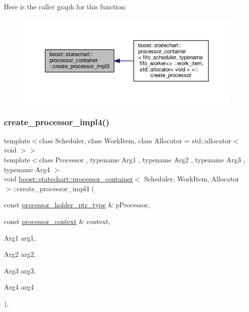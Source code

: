 Here is the caller graph for this function\+:
\nopagebreak
\begin{figure}[H]
\begin{center}
\leavevmode
\includegraphics[width=350pt]{classboost_1_1statechart_1_1processor__container_a980c59d8fe706a16906373841b911cac_icgraph}
\end{center}
\end{figure}
\mbox{\label{classboost_1_1statechart_1_1processor__container_a4e8370ed263cc0a9546117e065744fac}} 
\subsubsection{\texorpdfstring{create\+\_\+processor\+\_\+impl4()}{create\_processor\_impl4()}}
{\footnotesize\ttfamily template$<$class Scheduler, class Work\+Item, class Allocator = std\+::allocator$<$ void $>$$>$ \\
template$<$class Processor , typename Arg1 , typename Arg2 , typename Arg3 , typename Arg4 $>$ \\
void \mbox{\hyperlink{classboost_1_1statechart_1_1processor__container}{boost\+::statechart\+::processor\+\_\+container}}$<$ Scheduler, Work\+Item, Allocator $>$\+::create\+\_\+processor\+\_\+impl4 (\begin{DoxyParamCaption}\item[{const \mbox{\hyperlink{classboost_1_1statechart_1_1processor__container_a885e5a42694857bfaa44ec053ed20a57}{processor\+\_\+holder\+\_\+ptr\+\_\+type}} \&}]{p\+Processor,  }\item[{const \mbox{\hyperlink{classboost_1_1statechart_1_1processor__container_1_1processor__context}{processor\+\_\+context}} \&}]{context,  }\item[{Arg1}]{arg1,  }\item[{Arg2}]{arg2,  }\item[{Arg3}]{arg3,  }\item[{Arg4}]{arg4 }\end{DoxyParamCaption})\hspace{0.3cm}{\ttfamily [inline]}, {\ttfamily [private]}}

